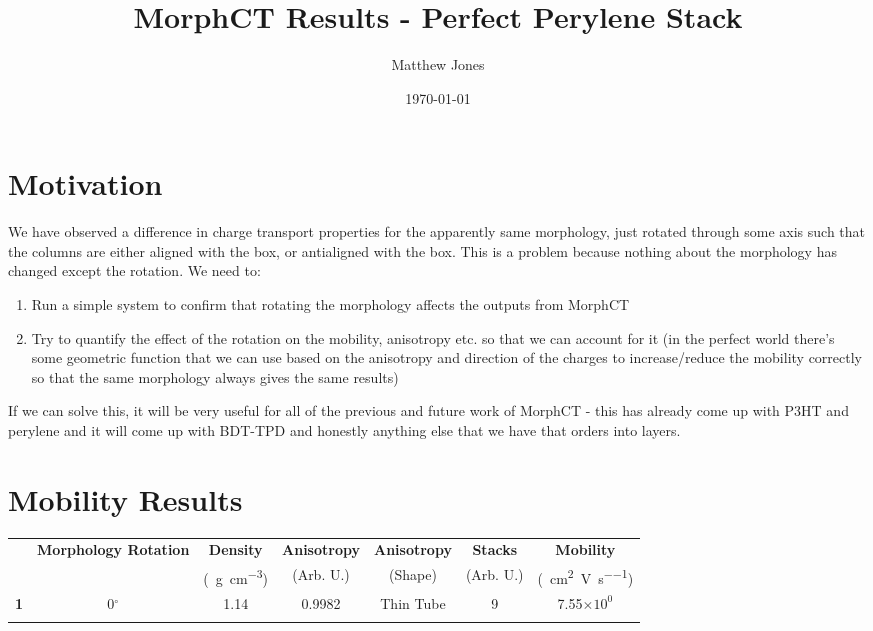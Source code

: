 \documentclass[12pt]{article}
\title{MorphCT Results - Perfect Perylene Stack}
\author{Matthew Jones}
\date{\today}
\def\mobunits{\square\centi\meter\per\volt\per\second}
\def\gcm{\gram\per\cubic\centi\meter}
\def\ccg{\cellcolor{gray}}
\begin{document}
\maketitle

\section{Motivation}

We have observed a difference in charge transport properties for the apparently same morphology, just rotated through some axis such that the columns are either aligned with the box, or antialigned with the box.
This is a problem because nothing about the morphology has changed except the rotation.
We need to:
\begin{enumerate}
    \item{Run a simple system to confirm that rotating the morphology affects the outputs from MorphCT}
    \item{Try to quantify the effect of the rotation on the mobility, anisotropy etc. so that we can account for it (in the perfect world there's some geometric function that we can use based on the anisotropy and direction of the charges to increase/reduce the mobility correctly so that the same morphology always gives the same results)}
\end{enumerate}
If we can solve this, it will be very useful for all of the previous and future work of MorphCT - this has already come up with P3HT and perylene and it will come up with BDT-TPD and honestly anything else that we have that orders into layers.

\clearpage

\section{Mobility Results}


\begin{center}
\begin{tabular}{| c | c | c | c | c | c | c |}
\hline
\rule{0pt}{2.5ex} 
\multirow{2}{*}{\textbf{ID}}&\multirow{2}{*}{\textbf{Morphology Rotation}}&\textbf{Density}&\textbf{Anisotropy}&\textbf{Anisotropy}&\textbf{Stacks}&\textbf{Mobility}\\
                            &&(\SI{}{\gcm})&(Arb. U.)&(Shape)&(Arb. U.)&(\SI{}{\mobunits})\\
\hhline{|=======|}
\textbf{\ccg1}&\rule{0pt}{2.5ex}\ccg 0$^{\circ}$&\ccg 1.14&\ccg 0.9982&\ccg Thin Tube&\ccg9&\ccg7.55$\times 10^{0}$\\
\hhline{-------}
\end{tabular}\label{table:mob}
\end{center}
\end{document}
